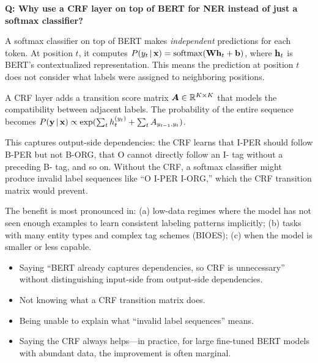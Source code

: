 \begin{interviewq}
\textbf{Q: Why use a CRF layer on top of BERT for NER instead of just a
softmax classifier?}

 \quad {} \quad \badgefreq{\freqhigh}

\stronganswer
A softmax classifier on top of BERT makes \emph{independent} predictions for
each token.  At position $t$, it computes
$P(y_t \,|\, \mathbf{x}) = \operatorname{softmax}(\mathbf{W} \mathbf{h}_t + \mathbf{b})$, where $\mathbf{h}_t$ is BERT's
contextualized representation.  This means the prediction at position $t$
does not consider what labels were assigned to neighboring positions.

A CRF layer adds a transition score matrix $\bm{A} \in \mathbb{R}^{K \times K}$ that
models the compatibility between adjacent labels.  The probability of the
entire sequence becomes
$P(\mathbf{y} \,|\, \mathbf{x}) \propto \exp(\sum_t h_t^{(y_t)} + \sum_t A_{y_{t-1}, y_t})$.

This captures output-side dependencies: the CRF learns that I-PER should
follow B-PER but not B-ORG, that O cannot directly follow an I- tag without a
preceding B- tag, and so on.  Without the CRF, a softmax classifier might
produce invalid label sequences like ``O I-PER I-ORG,'' which the CRF
transition matrix would prevent.

The benefit is most pronounced in: (a) low-data regimes where the model has
not seen enough examples to learn consistent labeling patterns implicitly;
(b) tasks with many entity types and complex tag schemes (BIOES); (c) when
the model is smaller or less capable.

\redflags
\begin{itemize}
    \item Saying ``BERT already captures dependencies, so CRF is unnecessary''
          without distinguishing input-side from output-side dependencies.
    \item Not knowing what a CRF transition matrix does.
    \item Being unable to explain what ``invalid label sequences'' means.
    \item Saying the CRF always helps---in practice, for large fine-tuned BERT
          models with abundant data, the improvement is often marginal.
\end{itemize}



\end{interviewq}
